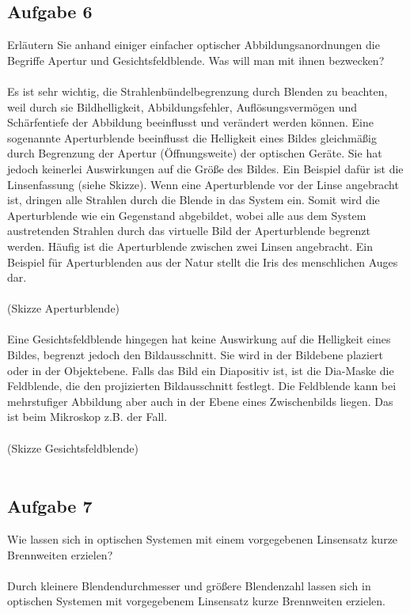 \documentclass[a4paper,10pt]{scrartcl}
\begin{document}
		\subsection{Aufgabe 6}
			Erläutern Sie anhand einiger einfacher optischer Abbildungsanordnungen die Begriffe Apertur und
			Gesichtsfeldblende. Was will man mit ihnen bezwecken?\\
			\\
			Es ist sehr wichtig, die Strahlenbündelbegrenzung durch Blenden zu beachten, weil durch sie Bildhelligkeit, Abbildungsfehler, Auflösungsvermögen und Schärfentiefe der Abbildung beeinflusst und verändert werden können. Eine sogenannte Aperturblende beeinflusst die Helligkeit eines Bildes gleichmäßig durch Begrenzung der Apertur (Öffnungsweite) der optischen Geräte. Sie hat jedoch keinerlei Auswirkungen auf die Größe des Bildes. Ein Beispiel dafür ist die Linsenfassung (siehe Skizze). Wenn eine Aperturblende vor der Linse angebracht ist, dringen alle Strahlen durch die Blende in das System ein. Somit wird die Aperturblende wie ein Gegenstand abgebildet, wobei alle aus dem System austretenden Strahlen durch das virtuelle Bild der Aperturblende begrenzt werden. Häufig ist die Aperturblende zwischen zwei Linsen angebracht. Ein Beispiel für Aperturblenden aus der Natur stellt die Iris des menschlichen Auges dar.\\
			\\
			(Skizze Aperturblende)\\
			\\
			Eine Gesichtsfeldblende hingegen hat keine Auswirkung auf die Helligkeit eines Bildes, begrenzt jedoch den Bildausschnitt. Sie wird in der Bildebene plaziert oder in der Objektebene. Falls das Bild ein Diapositiv ist, ist die Dia-Maske die Feldblende, die den projizierten Bildausschnitt festlegt. Die Feldblende kann bei mehrstufiger Abbildung aber auch in der Ebene eines Zwischenbilds liegen. Das ist beim Mikroskop z.B. der Fall. \\
			\\
			(Skizze Gesichtsfeldblende)\\
			\\
			
		\subsection{Aufgabe 7}
			Wie lassen sich in optischen Systemen mit einem vorgegebenen Linsensatz kurze Brennweiten
			erzielen?\\
			\\
			Durch kleinere Blendendurchmesser und größere Blendenzahl lassen sich in optischen Systemen mit vorgegebenem Linsensatz kurze Brennweiten erzielen.
			
\end{document}

